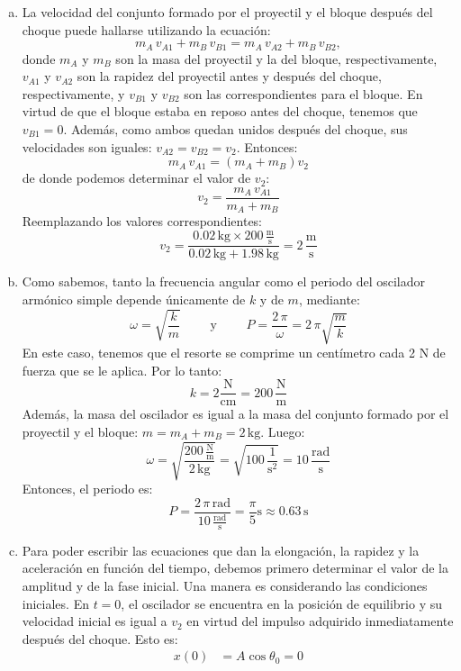 \documentclass[addpoints]{exam}
\begin{document}
\begin{questions}
    \begin{solution}
    \begin{enumerate}[a)]
        \item La velocidad del conjunto formado por el proyectil y el bloque después del choque puede hallarse utilizando la ecuación: $$m_A \, v_{A1} + m_B \, v_{B1} = m_A \, v_{A2} + m_B \, v_{B2},$$ donde $m_A$ y $m_B$ son la masa del proyectil y la del bloque, respectivamente, $v_{A1}$ y $v_{A2}$ son la rapidez del proyectil antes y después del choque, respectivamente, y $v_{B1}$ y $v_{B2}$ son las correspondientes para el bloque. En virtud de que el bloque estaba en reposo antes del choque, tenemos que $v_{B1} = 0$. Además, como ambos quedan unidos después del choque, sus velocidades son iguales: $v_{A2} = v_{B2} = v_2$. Entonces: $$m_A \, v_{A1} = \left(m_A + m_B\right) v_2$$ de donde podemos determinar el valor de $v_2$: $$v_2 = \frac{m_A \, v_{A1}}{m_A + m_B}$$ Reemplazando los valores correspondientes: $$v_2 = \frac{0.02 \, \text{kg} \times 200 \, \frac{\text{m}}{\text{s}}}{0.02 \, \text{kg} + 1.98 \, \text{kg}} = 2 \, \frac{\text{m}}{\text{s}}$$
        \item Como sabemos, tanto la frecuencia angular como el periodo del oscilador armónico simple depende únicamente de $k$ y de $m$, mediante: $$ \omega = \sqrt{\frac{k}{m}} \qquad \text{ y } \qquad P = \frac{2\, \pi}{\omega} = 2 \, \pi \sqrt{\frac{m}{k}}$$ En este caso, tenemos que el resorte se comprime un centímetro cada 2 N de fuerza que se le aplica. Por lo tanto: $$k = 2 \frac{\text{N}}{\text{cm}} = 200 \, \frac{\text{N}}{\text{m}}$$ Además, la masa del oscilador es igual a la masa del conjunto formado por el proyectil y el bloque: $m = m_A + m_B = 2 \, \text{kg}$. Luego: $$\omega = \sqrt{\frac{200 \, \frac{\text{N}}{\text{m}}}{2 \, \text{kg}}} = \sqrt{100 \, \frac{1}{\text{s}^2}} = 10 \, \frac{\text{rad}}{\text{s}}$$ Entonces, el periodo es: $$ P = \frac{2 \, \pi \,\text{rad}}{10 \, \frac{\text{rad}}{\text{s}}} = \frac{\pi}{5} \text{s} \approx 0.63 \, \text{s}$$
        \item Para poder escribir las ecuaciones que dan la elongación, la rapidez y la aceleración en función del tiempo, debemos primero determinar el valor de la amplitud y de la fase inicial. Una manera es considerando las condiciones iniciales. En $t= 0$, el oscilador se encuentra en la posición de equilibrio y su velocidad inicial es igual a $v_2$ en virtud del impulso adquirido inmediatamente después del choque. Esto es:
        \begin{align*}
        x(0) &= A \cos \theta_0 = 0 \\

\end{align*}
\end{enumerate}
\end{solution}
\end{questions}
\end{document}
